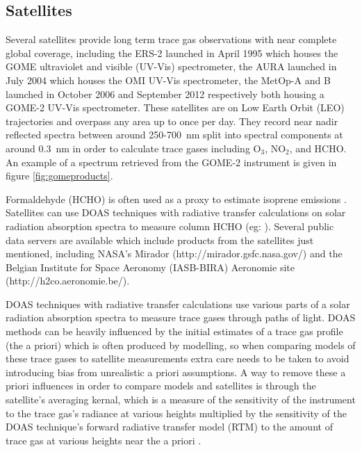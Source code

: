 \subsection{Satellites}
\label{satellites}
Several satellites provide long term trace gas observations with near complete global coverage, including the ERS-2 launched in April 1995 which houses the GOME ultraviolet and visible (UV-Vis) spectrometer, the AURA launched in July 2004 which houses the OMI UV-Vis spectrometer, the MetOp-A and B launched in October 2006 and September 2012 respectively both housing a GOME-2 UV-Vis spectrometer.
These satellites are on Low Earth Orbit (LEO) trajectories and overpass any area up to once per day. 
They record near nadir reflected spectra between around 250-700~nm split into spectral components at around $0.3$~nm in order to calculate trace gases including O$_3$, NO$_2$, and HCHO.
An example of a spectrum retrieved from the GOME-2 instrument is given in figure \ref{fig:gomeproducts}.

Formaldehyde (HCHO) is often used as a proxy to estimate isoprene emissions \cite{Marais_2012,bauwens2013satellite}.
Satellites can use DOAS techniques with radiative transfer calculations on solar radiation absorption spectra to measure column HCHO (eg: \citet{Leue_2001}).
Several public data servers are available which include products from the satellites just mentioned, including NASA's Mirador (http://mirador.gsfc.nasa.gov/) and the Belgian Institute for Space Aeronomy (IASB-BIRA) Aeronomie site (http://h2co.aeronomie.be/).

DOAS techniques with radiative transfer calculations use various parts of a solar radiation absorption spectra to measure trace gases through paths of light.
DOAS methods can be heavily influenced by the initial estimates of a trace gas profile (the a priori) which is often produced by modelling, so when comparing models of these trace gases to satellite measurements extra care needs to be taken to avoid introducing bias from unrealistic a priori assumptions.
A way to remove these a priori influences in order to compare models and satellites is through the satellite's averaging kernal, which is a measure of the sensitivity of the instrument to the trace gas's radiance at various heights multiplied by the sensitivity of the DOAS technique's forward radiative transfer model (RTM) to the amount of trace gas at various heights near the a priori \cite{Eskes_2003}.

